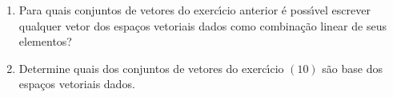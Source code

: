 \documentclass[a4paper,5pt]{amsbook}
\begin{document}
\begin{enumerate}
	\vspace{0.5cm}
	\item Para quais conjuntos de vetores do exerc\'{\i}cio anterior \'e poss\'{\i}vel
		escrever qualquer vetor dos espa\c{c}os vetoriais dados como combina\c{c}\~ao
		linear de seus elementos?

	\vspace{0.5cm}
	\item Determine quais dos conjuntos de vetores do exerc\'{\i}cio $(10)$ s\~ao
		base dos espa\c{c}os vetoriais dados.
\end{enumerate}
\end{document}
